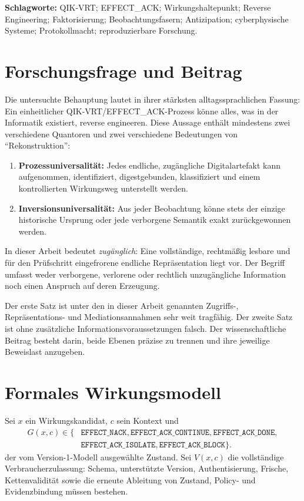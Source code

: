 \documentclass[11pt,a4paper]{article}
\newcommand{\DONE}{\texttt{EFFECT\_ACK\_DONE}}
\newcommand{\CONTINUE}{\texttt{EFFECT\_ACK\_CONTINUE}}
\newcommand{\BLOCK}{\texttt{EFFECT\_ACK\_BLOCK}}
\newcommand{\ISOLATE}{\texttt{EFFECT\_ACK\_ISOLATE}}
\newcommand{\NACK}{\texttt{EFFECT\_NACK}}
\begin{document}
\textbf{Schlagworte:} QIK-VRT; EFFECT\_ACK; Wirkungshaltepunkt; Reverse
Engineering; Faktorisierung; Beobachtungsfasern; Antizipation;
cyberphysische Systeme; Protokollmacht; reproduzierbare Forschung.

\section{Forschungsfrage und Beitrag}

Die untersuchte Behauptung lautet in ihrer stärksten alltagssprachlichen
Fassung: Ein einheitlicher QIK-VRT/EFFECT\_ACK-Prozess könne alles, was in der
Informatik existiert, reverse engineeren. Diese Aussage enthält mindestens
zwei verschiedene Quantoren und zwei verschiedene Bedeutungen von
``Rekonstruktion'':

\begin{enumerate}
  \item \textbf{Prozessuniversalität:} Jedes endliche, zugängliche
  Digitalartefakt kann aufgenommen, identifiziert, digestgebunden,
  klassifiziert und einem kontrollierten Wirkungsweg unterstellt werden.
  \item \textbf{Inversionsuniversalität:} Aus jeder Beobachtung könne stets
  der einzige historische Ursprung oder jede verborgene Semantik exakt
  zurückgewonnen werden.
\end{enumerate}

In dieser Arbeit bedeutet \emph{zugänglich}: Eine vollständige, rechtmäßig
lesbare und für den Prüfschritt eingefrorene endliche Repräsentation liegt vor.
Der Begriff umfasst weder verborgene, verlorene oder rechtlich unzugängliche
Information noch einen Anspruch auf deren Erzeugung.

Der erste Satz ist unter den in dieser Arbeit genannten Zugriffs-,
Repräsentations- und Mediationsannahmen sehr weit tragfähig. Der zweite Satz
ist ohne zusätzliche Informationsvoraussetzungen falsch. Der wissenschaftliche
Beitrag besteht darin, beide Ebenen präzise zu trennen und ihre jeweilige
Beweislast anzugeben.

\section{Formales Wirkungsmodell}

Sei $x$ ein Wirkungskandidat, $c$ sein Kontext und
\[
\begin{aligned}
G(x,c)\in\{&\NACK,\CONTINUE,\DONE,\\
            &\ISOLATE,\BLOCK\}.
\end{aligned}
\]
der vom Version-1-Modell ausgewählte Zustand. Sei $V(x,c)$ die vollständige
Verbraucherzulassung: Schema, unterstützte Version, Authentisierung,
Frische, Kettenvalidität sowie die erneute Ableitung von Zustand, Policy- und
Evidenzbindung müssen bestehen.
\end{document}
